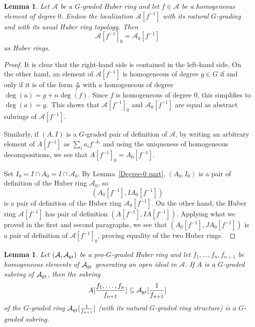 \documentclass[12pt,twoside,a4paper]{article}
\newtheorem{lemma}[thm]{Lemma}
\theoremstyle{definition}
\theoremstyle{remark}
\newcommand\gr{{\rm gr}}
\begin{document}
\begin{lemma}\label{Localization}Let $\mathcal{A}$ be a $G$-graded Huber ring and let $f\in \mathcal{A}$ be a homogeneous element of degree $0$. Endow the localization $\mathcal{A}[f^{-1}]$ with its natural $G$-grading and with its usual Huber ring topology. Then \begin{equation*}\mathcal{A}[f^{-1}]_{0}=\mathcal{A}_{0}[f^{-1}]\end{equation*}as Huber rings.\end{lemma}
\begin{proof}It is clear that the right-hand side is contained in the left-hand side. On the other hand, an element of $\mathcal{A}[f^{-1}]$ is homogeneous of degree $g\in G$ if and only if it is of the form $\frac{a}{f^{n}}$ with $a$ homogeneous of degree $\deg(a)=g+n\deg(f)$. Since $f$ is homogeneous of degree $0$, this simplifies to $\deg(a)=g$. This shows that $\mathcal{A}[f^{-1}]_{0}$ and $\mathcal{A}_{0}[f^{-1}]$ are equal as abstract subrings of $\mathcal{A}[f^{-1}]$. 

Similarly, if $(A, I)$ is a $G$-graded pair of definition of $\mathcal{A}$, by writing an arbitrary element of $A[f^{-1}]$ as $\sum_{i}a_{i}f^{-k_{i}}$ and using the uniqueness of homogeneous decompositions, we see that $A[f^{-1}]_{0}=A_{0}[f^{-1}]$. 

Set $I_{0}=I\cap A_{0}=I\cap \mathcal{A}_{0}$. By Lemma~\ref{Degree-0 part}, $(A_{0}, I_0)$ is a pair of definition of the Huber ring $\mathcal{A}_{0}$, so \begin{equation*}(A_{0}[f^{-1}], IA_{0}[f^{-1}])\end{equation*}is a pair of definition of the Huber ring $\mathcal{A}_{0}[f^{-1}]$. On the other hand, the Huber ring $\mathcal{A}[f^{-1}]$ has pair of definition $(A[f^{-1}], IA[f^{-1}])$. Applying what we proved in the first and second paragraphs, we see that $(A_{0}[f^{-1}], JA_{0}[f^{-1}])$ is a pair of definition of $\mathcal{A}[f^{-1}]_{0}$, proving equality of the two Huber rings. \end{proof} 
\begin{lemma}\label{Lemma on rational localizations}Let $(\mathcal{A}, \mathcal{A}_{\gr})$ be a pro-$G$-graded Huber ring and let $f_1,\dots, f_{n}, f_{n+1}$ be homogeneous elements of $\mathcal{A}_{\gr}$ generating an open ideal in $\mathcal{A}$. If $A$ is a $G$-graded subring of $\mathcal{A}_{\gr}$, then the subring \begin{equation*}A[\frac{f_1,\dots, f_n}{f_{n+1}}]\subseteq \mathcal{A}_{\gr}[\frac{1}{f_{n+1}}]\end{equation*}of the $G$-graded ring $\mathcal{A}_{\gr}[\frac{1}{f_{n+1}}]$ (with its natural $G$-graded ring structure) is a $G$-graded subring.\end{lemma}
\end{document}

